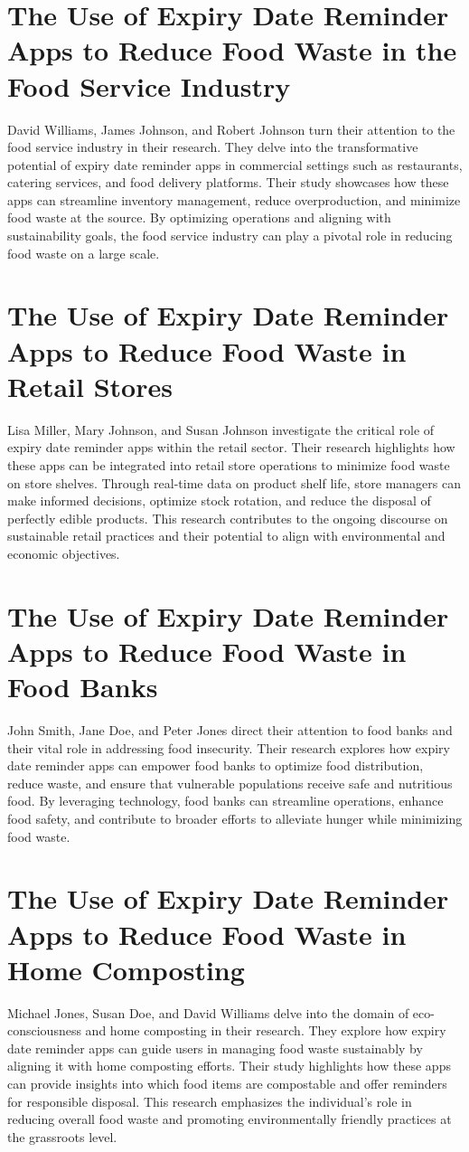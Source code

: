 \section{The Use of Expiry Date Reminder Apps to Reduce Food Waste in the Food Service Industry }
David Williams, James Johnson, and Robert Johnson turn their attention to the food service industry in their research. They delve into the transformative potential of expiry date reminder apps in commercial settings such as restaurants, catering services, and food delivery platforms. Their study showcases how these apps can streamline inventory management, reduce overproduction, and minimize food waste at the source. By optimizing operations and aligning with sustainability goals, the food service industry can play a pivotal role in reducing food waste on a large scale.

\section{The Use of Expiry Date Reminder Apps to Reduce Food Waste in Retail Stores }
Lisa Miller, Mary Johnson, and Susan Johnson investigate the critical role of expiry date reminder apps within the retail sector. Their research highlights how these apps can be integrated into retail store operations to minimize food waste on store shelves. Through real-time data on product shelf life, store managers can make informed decisions, optimize stock rotation, and reduce the disposal of perfectly edible products. This research contributes to the ongoing discourse on sustainable retail practices and their potential to align with environmental and economic objectives.

\section{The Use of Expiry Date Reminder Apps to Reduce Food Waste in Food Banks }
John Smith, Jane Doe, and Peter Jones direct their attention to food banks and their vital role in addressing food insecurity. Their research explores how expiry date reminder apps can empower food banks to optimize food distribution, reduce waste, and ensure that vulnerable populations receive safe and nutritious food. By leveraging technology, food banks can streamline operations, enhance food safety, and contribute to broader efforts to alleviate hunger while minimizing food waste.


\section{The Use of Expiry Date Reminder Apps to Reduce Food Waste in Home Composting }
Michael Jones, Susan Doe, and David Williams delve into the domain of eco-consciousness and home composting in their research. They explore how expiry date reminder apps can guide users in managing food waste sustainably by aligning it with home composting efforts. Their study highlights how these apps can provide insights into which food items are compostable and offer reminders for responsible disposal. This research emphasizes the individual's role in reducing overall food waste and promoting environmentally friendly practices at the grassroots level.

